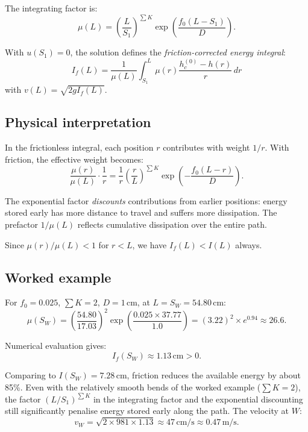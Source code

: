 \documentclass[11pt]{article}
\begin{document}
The integrating factor is:
\begin{equation}
  \mu(L) = \left(\frac{L}{S_1}\right)^{\sum K} \exp\left(\frac{f_0(L - S_1)}{D}\right).
  \label{eq:integrating-factor}
\end{equation}

With $u(S_1) = 0$, the solution defines the \emph{friction-corrected energy integral}:
\begin{equation}
  \boxed{I_f(L) = \frac{1}{\mu(L)} \int_{S_1}^{L} \mu(r) \frac{h_c^{(0)} - h(r)}{r} \, dr}
  \label{eq:I-f-def}
\end{equation}
with $v(L) = \sqrt{2gI_f(L)}$.

\subsection{Physical interpretation}

In the frictionless integral, each position $r$ contributes with weight $1/r$. With friction, the effective weight becomes:
\[
  \frac{\mu(r)}{\mu(L)} \cdot \frac{1}{r} = \frac{1}{r}\left(\frac{r}{L}\right)^{\sum K} \exp\left(-\frac{f_0(L-r)}{D}\right).
\]

The exponential factor \emph{discounts} contributions from earlier positions: energy stored early has more distance to travel and suffers more dissipation. The prefactor $1/\mu(L)$ reflects cumulative dissipation over the entire path.

Since $\mu(r)/\mu(L) < 1$ for $r < L$, we have $I_f(L) < I(L)$ always.

\subsection{Worked example}

For $f_0 = 0.025$, $\sum K = 2$, $D = 1$\,cm, at $L = S_W = 54.80$\,cm:
\[
  \mu(S_W) = \left(\frac{54.80}{17.03}\right)^2 \exp\left(\frac{0.025 \times 37.77}{1.0}\right) = (3.22)^2 \times e^{0.94} \approx 26.6.
\]

Numerical evaluation gives:
\begin{equation}
  I_f(S_W) \approx 1.13\,\text{cm} > 0.
  \label{eq:I-f-value}
\end{equation}

Comparing to $I(S_W) = 7.28$\,cm, friction reduces the available energy by about 85\%. Even with the relatively smooth bends of the worked example ($\sum K = 2$), the factor $(L/S_1)^{\sum K}$ in the integrating factor and the exponential discounting still significantly penalise energy stored early along the path. The velocity at $W$:
\[
  v_W = \sqrt{2 \times 981 \times 1.13} \approx 47\,\text{cm/s} \approx 0.47\,\text{m/s}.
\]
\end{document}
